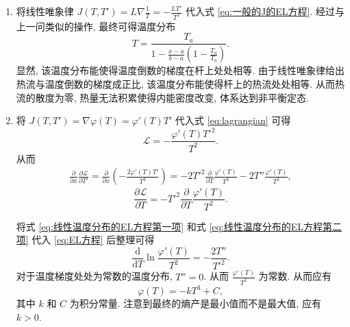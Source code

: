 \documentclass{article}
\begin{document}
\begin{enumerate}
\begin{enumerate}
	\item
	将线性唯象律 $J\left(T,T'\right)=L\nabla\frac1T=-\frac{LT'}{T^2}$ 代入式 \ref{eq:一般的J的EL方程}.
	经过与上一问类似的操作, 最终可得温度分布
	\begin{equation}
		T=\frac{T_a}{1-\frac{x-a}{b-a}\left(1-\frac{T_a}{T_b}\right)}.
	\end{equation}
	显然, 该温度分布能使得温度倒数的梯度在杆上处处相等.
	由于线性唯象律给出热流与温度倒数的梯度成正比, 该温度分布能使得杆上的热流处处相等.
	从而热流的散度为零, 热量无法积累使得内能密度改变, 体系达到非平衡定态.

	\item
	将 $J\left(T,T'\right)=\nabla\varphi\left(T\right)=\varphi'\left(T\right)T'$ 代入式 \ref{eq:lagrangian} 可得
	\begin{equation}
		\mathcal L=-\frac{\varphi'\left(T\right)T'^2}{T^2}.
		\label{eq:线性温度分布的lagrangian}
	\end{equation}
	从而
	\begin{align}
		\frac{\partial}{\partial x}\frac{\partial\mathcal L}{\partial T'}
		=\frac{\partial}{\partial x}\left(-\frac{2\varphi'\left(T\right)T'}{T^2}\right)=-2T'^2\frac{\partial}{\partial T}\frac{\varphi'\left(T\right)}{T^2}-2T''\frac{\varphi'\left(T\right)}{T^2},
		\label{eq:线性温度分布的EL方程第一项}
	\end{align}
	\begin{equation}
		\frac{\partial\mathcal L}{\partial T}=-T'^2\frac{\partial}{\partial T}\frac{\varphi'\left(T\right)}{T^2}.
		\label{eq:线性温度分布的EL方程第二项}
	\end{equation}

	将式 \ref{eq:线性温度分布的EL方程第一项} 和式 \ref{eq:线性温度分布的EL方程第二项} 代入 \ref{eq:EL方程} 后整理可得
	\begin{equation}
		\frac{\mathrm d}{\mathrm dT}\ln\frac{\varphi'\left(T\right)}{T^2}=-\frac{2T''}{T'^2}.
	\end{equation}
	对于温度梯度处处为常数的温度分布, $T''=0$.
	从而 $\frac{\varphi'\left(T\right)}{T^2}$ 为常数.
	从而应有
	\begin{equation}
		\varphi\left(T\right)=-kT^3+C,
	\end{equation}
	其中 $k$ 和 $C$ 为积分常量.
	注意到最终的熵产是最小值而不是最大值, 应有 $k>0$.

\end{enumerate}

\end{enumerate}
\end{document}
